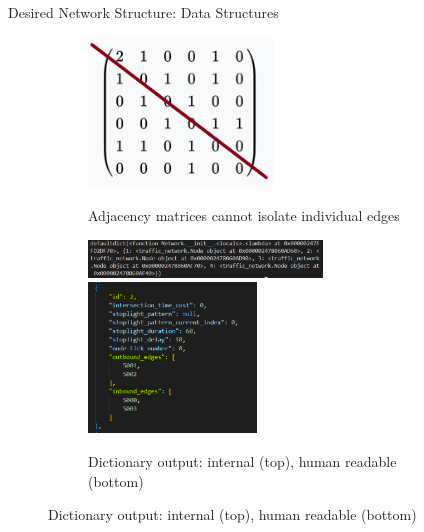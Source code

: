     \begin{frame}{Desired Network Structure: Data Structures}
        \begin{figure}
            \centering
            \begin{figure}[ht]
                \begin{minipage}[b]{0.45\linewidth}
                    \centering
                    \includegraphics[width=\textwidth, height=4cm]{Images/adj_matrix.png}
                    \caption{Adjacency matrices cannot isolate individual edges}
                    \label{fig:a}
                \end{minipage}
                \hspace{0.5cm}
                \begin{minipage}[b]{0.45\linewidth}
                    \centering
                    \includegraphics[width=\textwidth, height=1cm]{Images/code_dict.png}
                    \includegraphics[width=\textwidth, height=4cm]{Images/human readable.PNG}
                    \caption{Dictionary output:  internal (top), human readable (bottom)}
                    \label{fig:b}
                \end{minipage}
            \end{figure}
        \end{figure}
    \end{frame}

